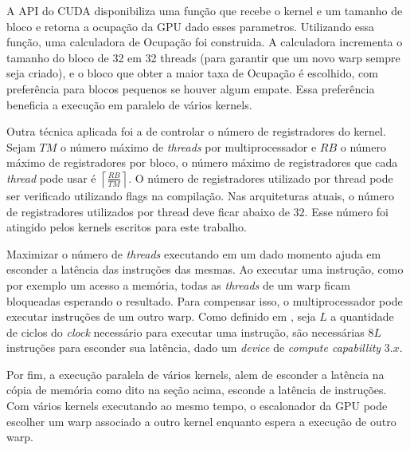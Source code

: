   A API do CUDA disponibiliza uma função que recebe o kernel e um tamanho de
bloco e retorna a ocupação da GPU dado esses parametros. Utilizando essa função,
uma calculadora de Ocupação foi construida. A calculadora incrementa o
tamanho do bloco de 32 em 32 threads (para garantir que um novo warp sempre
seja criado), e o bloco que obter a maior taxa de Ocupação é escolhido, com
preferência para blocos pequenos se houver algum empate. Essa preferência beneficia
a execução em paralelo de vários kernels.

  Outra técnica aplicada foi a de controlar o número de registradores do kernel.
Sejam $TM$ o número máximo de \textit{threads} por multiprocessador e $RB$ o
número máximo de registradores por bloco, o número máximo de registradores que
cada \textit{thread} pode usar é $\left \lceil{\frac{RB}{TM}}\right \rceil$.
O número de registradores utilizado por thread pode ser verificado utilizando
flags na compilação. Nas arquiteturas atuais, o número de registradores
utilizados por thread deve ficar abaixo de $32$. Esse número foi atingido pelos
kernels escritos para este trabalho.

  Maximizar o número de \textit{threads} executando em um dado momento ajuda em
esconder a latência das instruções das mesmas. Ao executar uma instrução,
como por exemplo um acesso a memória, todas as \textit{threads} de um warp
ficam bloqueadas esperando o resultado. Para compensar isso, o multiprocessador
pode executar instruções de um outro warp. Como definido em \cite{cudaProgrammingGuide},
seja $L$ a quantidade de ciclos do \textit{clock} necessário para executar uma
instrução, são necessárias $8L$ instruções para esconder sua latência, dado um
\textit{device} de \textit{compute capabillity} $3.x$.

  Por fim, a execução paralela de vários kernels, alem de esconder a latência
na cópia de memória como dito na seção acima, esconde a latência de instruções.
Com vários kernels executando ao mesmo tempo, o escalonador da GPU pode escolher
um warp associado a outro kernel enquanto espera a execução de outro warp.
